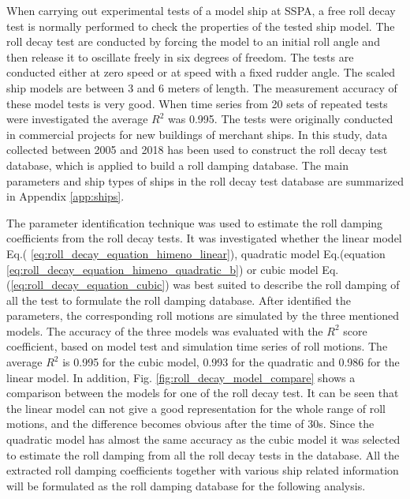 When carrying out experimental tests of a model ship at SSPA, a free roll decay test is normally performed to check the properties of the tested ship model.
The roll decay test are conducted by forcing the model to an initial roll angle and then release it to oscillate freely in six degrees of freedom. The tests are conducted either  at zero speed or at speed with a fixed rudder angle. The scaled ship models are between 3 and 6 meters of length. The measurement accuracy of these model tests is very good. When time series from 20 sets of repeated tests were investigated the average $R^2$ was 0.995. The tests were originally conducted in commercial projects for new buildings of merchant ships. In this study, data collected between 2005 and 2018 has been used to construct the roll decay test database, which is applied to build a roll damping database. The main parameters and ship types of ships in the roll decay test database are summarized in Appendix \ref{app:ships}. 

The parameter identification technique was used to estimate the roll damping coefficients from the roll decay tests. It was investigated whether the linear model Eq.( \ref{eq:roll_decay_equation_himeno_linear}), quadratic model Eq.(equation \ref{eq:roll_decay_equation_himeno_quadratic_b}) or cubic model Eq.(\ref{eq:roll_decay_equation_cubic}) was best suited to describe the roll damping of all the test to formulate the roll damping database. After identified the parameters, the corresponding roll motions are simulated by the three mentioned models. The accuracy of the three models was evaluated with the $R^2$ score coefficient, based on model test and simulation time series of roll motions.
The average $R^2$ is 0.995 for the cubic model, 0.993 for the quadratic and 0.986 for the linear model. In addition, Fig. \ref{fig:roll_decay_model_compare} shows a comparison between the models for one of the roll decay test. It can be seen that the linear model can not give a good representation for the whole range of roll motions, and the difference becomes obvious after the time of 30s. Since the quadratic model has almost the same accuracy as the cubic model it was selected to estimate the roll damping from all the roll decay tests in the database. All the extracted roll damping coefficients together with various ship related information will be formulated as the roll damping database for the following analysis.



